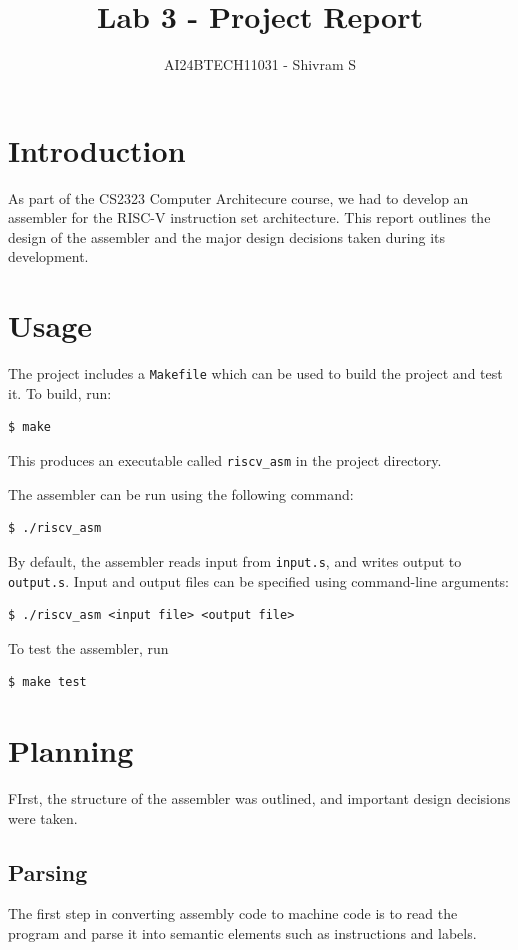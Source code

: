\documentclass{article}
\title{Lab 3 - Project Report}
\author{AI24BTECH11031 - Shivram S}
\date{}
\begin{document}
\maketitle
\tableofcontents
\pagebreak

\section{Introduction}

As part of the CS2323 Computer Architecure course, we had to develop an assembler
for the RISC-V instruction set architecture. This report outlines the design of the 
assembler and the major design decisions taken during its development.

\section{Usage}

The project includes a \texttt{Makefile} which can be used to build the project and
test it. To build, run:
\begin{verbatim}
$ make
\end{verbatim} 
This produces an executable called \texttt{riscv\_asm} in the project directory.

The assembler can be run using the following command:
\begin{verbatim}
$ ./riscv_asm
\end{verbatim}
By default, the assembler reads input from \texttt{input.s}, and writes output
to \texttt{output.s}. Input and output files can be specified using command-line
arguments:
\begin{verbatim}
$ ./riscv_asm <input file> <output file>
\end{verbatim}
To test the assembler, run
\begin{verbatim}
$ make test
\end{verbatim}


\section{Planning}

FIrst, the structure of the assembler was outlined, and important design decisions
were taken.


\subsection{Parsing}

The first step in converting assembly code to machine code is to read the program
and parse it into semantic elements such as instructions and labels.
\end{document}
